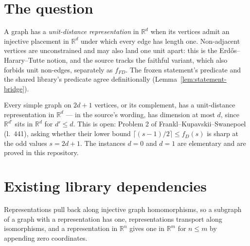 \section{The question}

\begin{definition}
  \label{def:representation}
  \leanok
  A graph has a \emph{unit-distance representation} in $\mathbb{R}^d$ when its vertices admit
  an injective placement in $\mathbb{R}^d$ under which every edge has length one. Non-adjacent
  vertices are unconstrained and may also land one unit apart: this is the
  Erd\H{o}s--Harary--Tutte notion, and the source tracks the faithful variant, which also
  forbids unit non-edges, separately as $f_{FD}$. The frozen statement's predicate and the
  shared library's predicate agree definitionally (Lemma~\ref{lem:statement-bridge}).
\end{definition}

\begin{conjecture}
  \label{que:fks}
  Every simple graph on $2d + 1$ vertices, or its complement, has a unit-distance
  representation in $\mathbb{R}^d$ --- in the source's wording, has dimension at most $d$,
  since $\mathbb{R}^{d'}$ sits in $\mathbb{R}^d$ for $d' \le d$. This is open: Problem 2 of
  Frankl--Kupavskii--Swanepoel (l.~441), asking whether their lower bound
  $\lceil (s - 1)/2 \rceil \le f_D(s)$ is sharp at the odd values $s = 2d + 1$. The instances
  $d = 0$ and $d = 1$ are elementary and are proved in this repository.
\end{conjecture}

\section{Existing library dependencies}

\begin{lemma}
  \label{lem:transfer}
  \leanok
  Representations pull back along injective graph homomorphisms, so a subgraph of a graph
  with a representation has one, representations transport along isomorphisms, and a
  representation in $\mathbb{R}^n$ gives one in $\mathbb{R}^m$ for $n \le m$ by appending zero
  coordinates.
\end{lemma}

